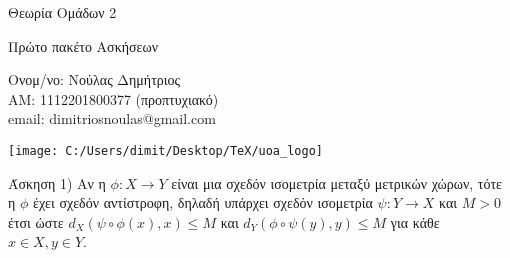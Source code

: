 \documentclass[oneside,a4paper]{article}
\newcommand {\tl}{\textlatin}
\begin{document}
	
	
	\begin{framed}	
		\begin{center}
			\huge Θεωρία Ομάδων 2
		\end{center}
		\begin{center}
			\huge Πρώτο πακέτο Ασκήσεων
		\end{center}
		\vspace{0.3truecm}
		\begin{center}
			Ονομ/νο: Νούλας Δημήτριος\\
			ΑΜ: 1112201800377 (προπτυχιακό) \\
			\tl{email}: \tl{dimitriosnoulas@gmail.com}
		\end{center}
		\vspace{0.3truecm}
	\end{framed}
	\vspace*{\fill}
	\begin{center}
	\texttt{[image: C:/Users/dimit/Desktop/TeX/uoa\_logo]}
	\end{center}
\vspace{1cm}
\pagebreak


\noindent Άσκηση 1) Αν η $\phi: X \rightarrow Y$ είναι μια σχεδόν ισομετρία μεταξύ μετρικών χώρων, τότε η $\phi$ έχει σχεδόν αντίστροφη, δηλαδή υπάρχει σχεδόν ισομετρία $\psi: Y \rightarrow X$ και $M >0$ έτσι ώστε $d_X(\psi \circ \phi(x),x) \leq M$ και $d_Y (\phi \circ \psi(y),y) \leq M$ για κάθε $x \in X, y \in Y$.
\end{document}
